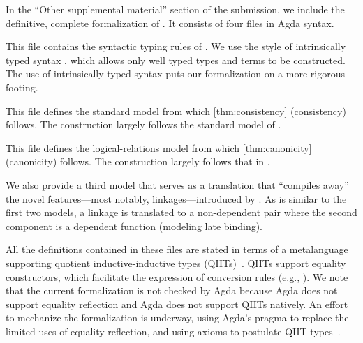 In the ``Other supplemental material'' section of the submission, we
include the definitive, complete formalization of \TT.
It consists of four files in Agda syntax.
%

\begin{description}[
    itemsep=.5ex,topsep=.6ex,
    labelsep=1.5ex,
    leftmargin=6.5ex,
    font=\ttfamily\bfseries,
]

\item[Syntax.agda]

This file contains the syntactic typing rules of \TT.
We use the style of intrinsically typed syntax \cite{chapman2009type},
which allows only well typed \TT types and terms to be constructed.
The use of intrinsically typed syntax puts our formalization on a more
rigorous footing.

\item[Semantic.agda]

This file defines the standard model from which
\cref{thm:consistency} (consistency) follows.
%
The construction largely follows the standard model of
\cite{altkap2016,kaposi2017type,kaposi2019gluing}.

\item[Canonicity.agda]

This file defines the logical-relations model from which
\cref{thm:canonicity} (canonicity) follows.
%
The construction largely follows that in
\cite{coquand2018canonicity,sterling2019algebraic}.

\item[SynTranslation.agda]

We also provide a third model that serves as a translation that ``compiles
away'' the novel features---most notably, linkages---introduced by \TT.
As is similar to the first two models, 
a linkage is translated to a non-dependent pair where the
second component is a dependent function (modeling late binding).

\end{description}

All the definitions contained in these files are stated in
terms of a meta\-language supporting quotient inductive-inductive types
(QIITs)~\cite{nordvall2010inductive,altkap2016}.
QIITs support equality constructors, which facilitate the expression of
conversion rules (e.g., ).
%
We note that the current formalization is not checked by Agda because
Agda does not support equality reflection and Agda does not support QIITs natively.
An effort to mechanize the formalization is underway, using Agda's
 pragma to replace the limited uses of equality reflection, 
and using axioms to postulate QIIT types~\cite{altkap2016}.

